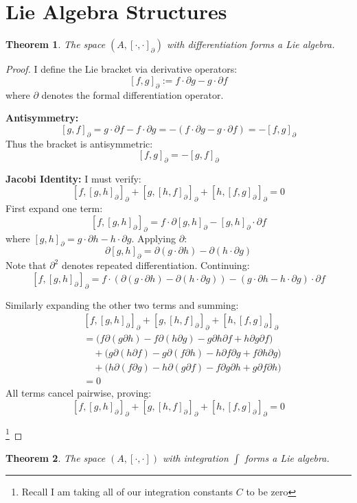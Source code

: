 \documentclass{artjlt}
\newtheorem{thm}{Theorem}
\newcommand{\?}{\textbackslash}
\begin{document}
\section{Lie Algebra Structures}
   \begin{thm}
The space $(A, [\cdot,\cdot]_\partial)$ with differentiation forms a Lie algebra.
\end{thm}
\begin{proof}
I define the Lie bracket via derivative operators:
\[
[f,g]_\partial := f \cdot \partial g - g \cdot \partial f 
\]
where $\partial$ denotes the formal differentiation operator.

\noindent\textbf{Antisymmetry:}
\[
[g,f]_\partial = g \cdot \partial f - f \cdot \partial g = - (f \cdot \partial g - g \cdot \partial f) = -[f,g]_\partial
\]
Thus the bracket is antisymmetric:
\[
\boxed{[f,g]_\partial = -[g,f]_\partial} 
\]

\noindent\textbf{Jacobi Identity:}
I must verify:
\[
[f,[g,h]_\partial]_\partial + [g,[h,f]_\partial]_\partial + [h,[f,g]_\partial]_\partial = 0
\]
First expand one term:
\[
[f,[g,h]_\partial]_\partial = f \cdot \partial[g,h]_\partial - [g,h]_\partial \cdot \partial f
\]
where $[g,h]_\partial = g \cdot \partial h - h \cdot \partial g$. Applying $\partial$:
\[
\partial[g,h]_\partial = \partial(g \cdot \partial h) - \partial(h \cdot \partial g)
\]
Note that $\partial^2$ denotes repeated differentiation. Continuing:
\[
[f,[g,h]_\partial]_\partial = f \cdot (\partial(g \cdot \partial h) - \partial(h \cdot \partial g)) - (g \cdot \partial h - h \cdot \partial g) \cdot \partial f
\]

Similarly expanding the other two terms and summing:
\[
\begin{aligned}
&[f,[g,h]_\partial]_\partial + [g,[h,f]_\partial]_\partial + [h,[f,g]_\partial]_\partial \\
&= \big(f \partial(g \partial h) - f \partial(h \partial g) - g \partial h \partial f + h \partial g \partial f\big) \\
&\quad + \big(g \partial(h \partial f) - g \partial(f \partial h) - h \partial f \partial g + f \partial h \partial g\big) \\
&\quad + \big(h \partial(f \partial g) - h \partial(g \partial f) - f \partial g \partial h + g \partial f \partial h\big) \\
&= 0
\end{aligned}
\]
All terms cancel pairwise, proving:
\[
\boxed{[f,[g,h]_\partial]_\partial + [g,[h,f]_\partial]_\partial + [h,[f,g]_\partial]_\partial = 0}
\]

\footnote{Recall I am taking all of our integration constants $C$ to be zero}
\end{proof}
\begin{thm}
The space $(A, [\cdot,\cdot])$ with integration $\int$ forms a Lie algebra.
\end{thm}
\end{document}
